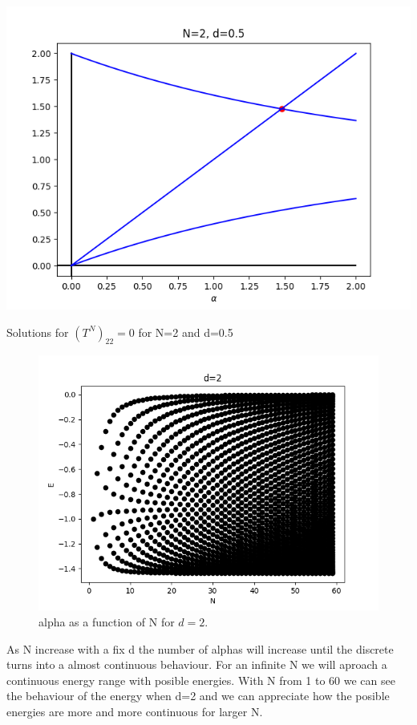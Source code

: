 \begin{marginfigure}
  \includegraphics{images5/N=2,d=0.5.png}
  \centering
  \caption{Solutions for $(T^N)_{22} = 0$ for N=2 and d=0.5}
\end{marginfigure}


\begin{figure}
  \includegraphics[H]{images5/N_E_d_eff=2.png}
  \centering
  \caption{alpha as a function of N for $d = 2$.}
\end{figure}

As N increase with a fix d the number of alphas will increase until the discrete turns into a almost continuous behaviour. For an infinite N we will aproach a continuous energy range with posible energies. With N from 1 to 60 we can see the behaviour of the energy when d=2 and we can appreciate how the posible energies are more and more continuous for larger N.


